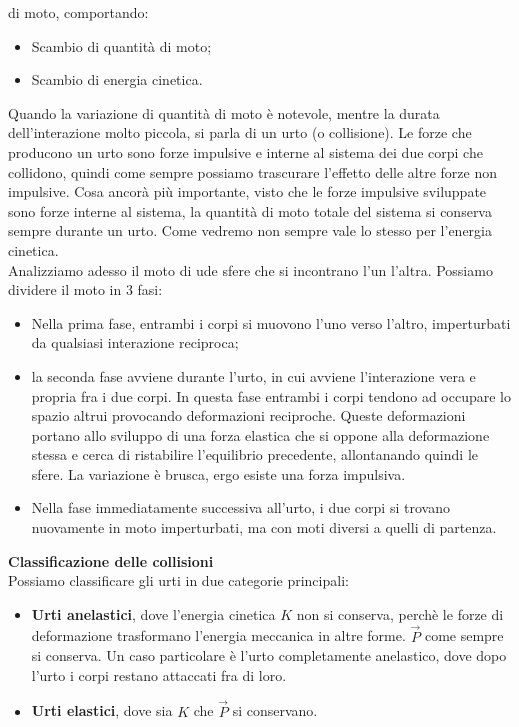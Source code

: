 \documentclass[a4paper,12pt]{article}
\begin{document}
di moto, comportando:
\begin{itemize}
  \item Scambio di quantità di moto;
  \item Scambio di energia cinetica.
\end{itemize}
Quando la variazione di quantità di moto è notevole, mentre la durata dell'interazione molto piccola, si parla
di un urto (o collisione). Le forze che producono un urto sono forze impulsive e interne al sistema dei due
corpi che collidono, quindi come sempre possiamo trascurare l'effetto delle altre forze non impulsive. Cosa
ancorà più importante, visto che le forze impulsive sviluppate sono forze interne al sistema, la quantità
di moto totale del sistema si conserva sempre durante un urto. Come vedremo non sempre vale lo stesso per
l'energia cinetica. \\ Analizziamo adesso il moto di ude sfere che si incontrano l'un l'altra. Possiamo dividere
il moto in 3 fasi:
\begin{itemize}
  \item Nella prima fase, entrambi i corpi si muovono l'uno verso l'altro, imperturbati da qualsiasi interazione reciproca;
  \item la seconda fase avviene durante l'urto, in cui avviene l'interazione vera e propria fra i due corpi.
    In questa fase entrambi i corpi tendono ad occupare lo spazio altrui provocando deformazioni reciproche. Queste
    deformazioni portano allo sviluppo di una forza elastica che si oppone alla deformazione stessa e cerca di ristabilire
    l'equilibrio precedente, allontanando quindi le sfere. La variazione è brusca, ergo esiste una forza impulsiva.
  \item Nella fase immediatamente successiva all'urto, i due corpi si trovano nuovamente in moto imperturbati, ma con
    moti diversi a quelli di partenza.
\end{itemize}
\par\smallskip
\textbf{Classificazione delle collisioni} \\
Possiamo classificare gli urti in due categorie principali:
\begin{itemize}
  \item \textbf{Urti anelastici}, dove l'energia cinetica $K$ non si conserva, perchè le forze di deformazione
    trasformano l'energia meccanica in altre forme. $\vec{P}$ come sempre si conserva. Un caso particolare è l'urto completamente
    anelastico, dove dopo l'urto i corpi restano attaccati fra di loro.
  \item \textbf{Urti elastici}, dove sia $K$ che $\vec{P}$ si conservano.
\end{itemize}
\end{document}
